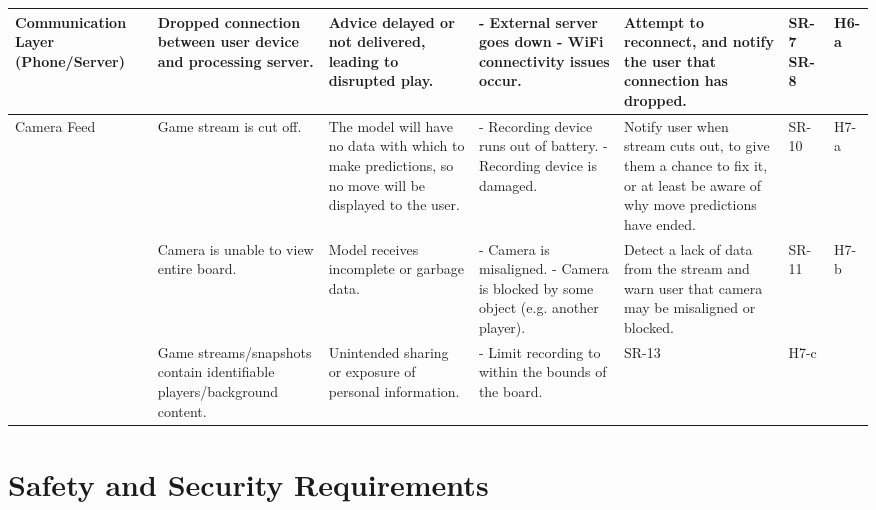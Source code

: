 \documentclass{article}
\begin{document}
\begin{landscape}
\begin{tabularx}{\linewidth}{|P{2.5cm}|Y|Y|Y|Y|P{1cm}|P{1cm}|}
        \hline

        Communication Layer (Phone/Server) &
        Dropped connection between user device and processing server. &
        Advice delayed or not delivered, leading to disrupted play. &
        - External server goes down \newline - WiFi connectivity issues occur. &
        Attempt to reconnect, and notify the user that connection has dropped. &
        SR-7 \newline SR-8 &
        H6-a \\

        \hline

        Camera Feed &
        Game stream is cut off. &
        The model will have no data with which to make predictions, so no move will be displayed to the user. &
        - Recording device runs out of battery. \newline - Recording device is damaged. &
        Notify user when stream cuts out, to give them a chance to fix it, or at least be aware of why move predictions have ended. &
        SR-10 &
        H7-a \\

        &
        Camera is unable to view entire board. &
        Model receives incomplete or garbage data. &
        - Camera is misaligned. \newline - Camera is blocked by some object (e.g. another player). &
        Detect a lack of data from the stream and warn user that camera may be misaligned or blocked. &
        SR-11 &
        H7-b \\

        &
        Game streams/snapshots contain identifiable players/background content.
        &
        Unintended sharing or exposure of personal information. &
        - Limit recording to within the bounds of the board. &
        SR-13 &
        H7-c \\

    \end{tabularx}
\end{landscape}

\section{Safety and Security Requirements}\label{sec:safety-and-security-requirements}

\end{document}
